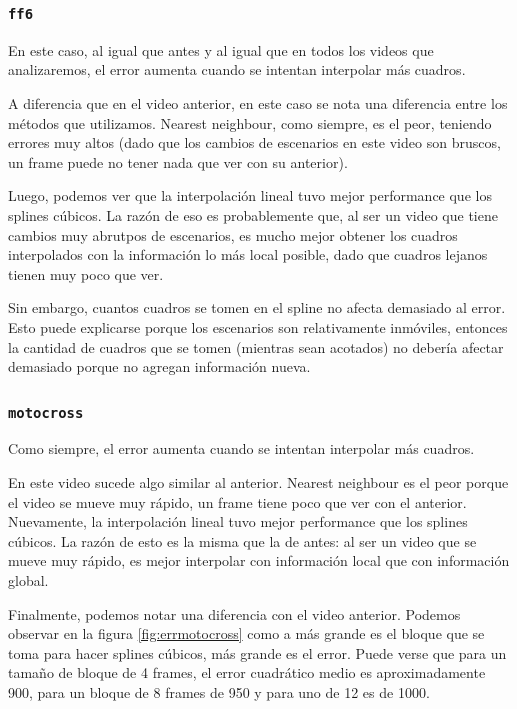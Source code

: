 \subsubsection{\texttt{ff6}}

En este caso, al igual que antes y al igual que en todos los videos que analizaremos, el error aumenta cuando se intentan interpolar más cuadros.


A diferencia que en el video anterior, en este caso se nota una diferencia entre los m\'etodos que utilizamos. Nearest neighbour, como siempre, es el peor, teniendo errores muy altos (dado que los cambios de escenarios en este video son bruscos, un frame puede no tener nada que ver con su anterior).


Luego, podemos ver que la interpolación lineal tuvo mejor performance que los splines cúbicos. La razón de eso es probablemente que, al ser un video que tiene cambios muy abrutpos de escenarios, es mucho mejor obtener los cuadros interpolados con la información lo más local posible, dado que cuadros lejanos tienen muy poco que ver.

Sin embargo, cuantos cuadros se tomen en el spline no afecta demasiado al error. Esto puede explicarse porque los escenarios son relativamente inmóviles, entonces la cantidad de cuadros que se tomen (mientras sean acotados) no debería afectar demasiado porque no agregan información nueva.

\subsubsection{\texttt{motocross}}

Como siempre, el error aumenta cuando se intentan interpolar más cuadros.

En este video sucede algo similar al anterior. Nearest neighbour es el peor porque el video se mueve muy rápido, un frame tiene poco que ver con el anterior. Nuevamente, la interpolación lineal tuvo mejor performance que los splines cúbicos. La razón de esto es la misma que la de antes: al ser un video que se mueve muy rápido, es mejor interpolar con información local que con información global.

Finalmente, podemos notar una diferencia con el video anterior. Podemos observar en la figura \ref{fig:errmotocross} como a más grande es el bloque que se toma para hacer splines cúbicos, más grande es el error. Puede verse que para un tamaño de bloque de 4 frames, el error cuadrático medio es aproximadamente 900, para un bloque de 8 frames de 950 y para uno de 12 es de 1000. 


